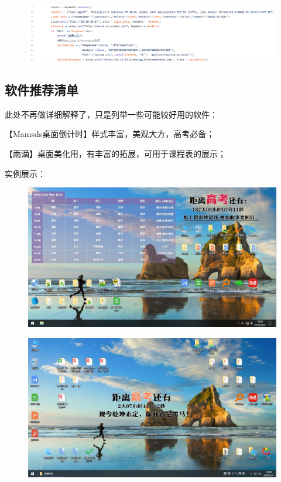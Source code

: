 \documentclass{article}
\begin{document}
        \begin{figure}[htbp]
        \centering
        \includegraphics[scale=0.30]{2.3-p2.png}
        \end{figure}

        \subsection{软件推荐清单}
        此处不再做详细解释了，只是列举一些可能较好用的软件：

        【Mamsds桌面倒计时】样式丰富，美观大方，高考必备；

        【雨滴】桌面美化用，有丰富的拓展，可用于课程表的展示；

        实例展示：

        \begin{figure}[htbp]
        \centering
        \includegraphics[scale=0.25]{2.3-p4.png}
        \end{figure}

        \begin{figure}[htbp]
        \centering
        \includegraphics[scale=0.25]{2.3-p5.png}
        \end{figure}
\end{document}

